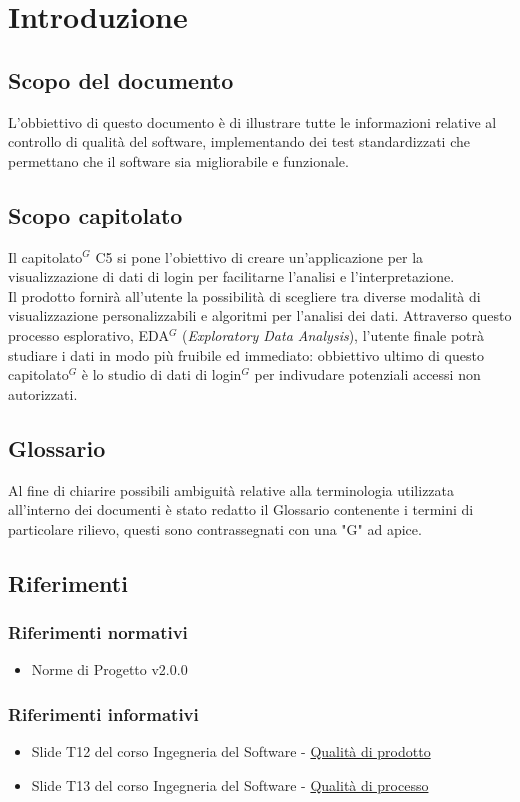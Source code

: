 \section{Introduzione}

\subsection{Scopo del documento}

L'obbiettivo di questo documento è di illustrare tutte le informazioni relative al controllo di qualità del software, implementando dei test standardizzati che permettano che il software sia migliorabile e funzionale.

\subsection{Scopo capitolato}
Il capitolato$^{G}$ C5 si pone l'obiettivo di creare un'applicazione per la visualizzazione di dati
di login per facilitarne l'analisi e l'interpretazione.\\
Il prodotto fornirà all'utente la possibilità di scegliere tra diverse modalità di visualizzazione personalizzabili 
e algoritmi per l'analisi dei dati. Attraverso questo processo esplorativo, EDA$^{G}$ (\textit{Exploratory Data Analysis}), 
l'utente finale potrà studiare i dati in modo più fruibile ed immediato: obbiettivo ultimo di questo capitolato$^{G}$ 
è lo studio di dati di login$^{G}$ per indivudare potenziali accessi non autorizzati.

\subsection{Glossario}
Al fine di chiarire possibili ambiguità relative alla terminologia utilizzata all'interno dei
documenti è stato redatto il Glossario contenente i termini di particolare rilievo, questi
sono contrassegnati con una "G" ad apice.

\subsection{Riferimenti}
\subsubsection{Riferimenti normativi}
\begin{itemize}
    \item Norme di Progetto v2.0.0
\end{itemize}

\subsubsection{Riferimenti informativi}
\begin{itemize}
    \item Slide T12 del corso Ingegneria del Software -  \href{https://www.math.unipd.it/~tullio/IS-1/2021/Dispense/T12.pdf}{Qualità di prodotto}
    \item Slide T13 del corso Ingegneria del Software - \href{https://www.math.unipd.it/~tullio/IS-1/2021/Dispense/T13.pdf}{Qualità di processo}  
\end{itemize}
\newpage